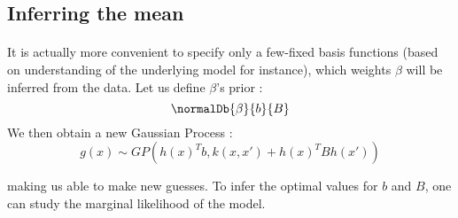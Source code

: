 \documentclass[a4paper]{article}
\begin{document}
{{			\subsection{Inferring the mean}
			{
				\paragraph{} It is actually more convenient to specify only a few-fixed basis functions (based on understanding of the underlying model for instance), which weights $\beta$ will be inferred from the data. Let us define $\beta$'s prior : 
				\begin{equation}
					\normalDb{\beta}{b}{B}
				\end{equation}
				We then obtain a new Gaussian Process : 
				\begin{equation}
					g(x) \sim GP( h(x)^Tb, k(x,x')+h(x)^TBh(x') )
				\end{equation}
			}
			making us able to make new guesses. To infer the optimal values for $b$ and $B$, one can study the marginal likelihood of the model. 
			
		}
	}
	
\end{document}
